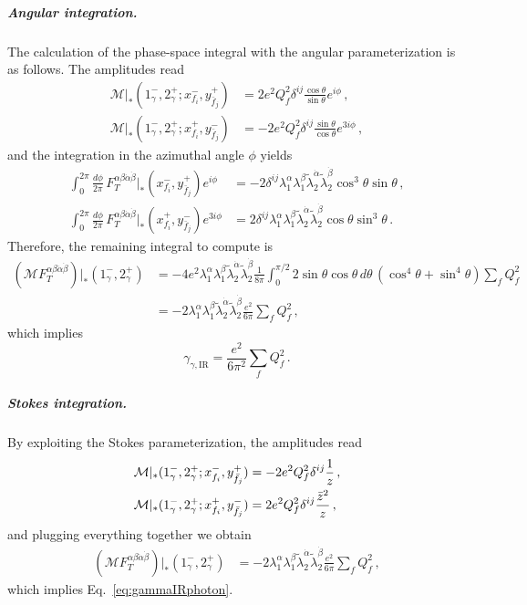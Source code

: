 \subparagraph{Angular integration.}
The calculation of the phase-space integral with the angular parameterization is as follows.
The amplitudes read
\begin{align}
    \mathcal M|_{*} (1^-_\gamma,2^+_\gamma; x_{f_i}^{-},y_{\bar f_j}^{+}) &= 2e^2 Q_f^2 \delta^{ij}\frac{\cos\theta}{\sin\theta}e^{i\phi}\,, \\
    \mathcal M|_{*} (1^-_\gamma,2^+_\gamma; x_{f_i}^{+},y_{\bar f_j}^{-}) &= -2e^2 Q_f^2 \delta^{ij}\frac{\sin\theta}{\cos\theta}e^{3i\phi}\,,
\end{align}
and the integration in the azimuthal angle $\phi$ yields
\begin{align}
    \int_0^{2\pi}\frac{d\phi}{2\pi}\,F_T^{\alpha\beta\dot\alpha\dot\beta}|_{*}(x_{f_i}^{-},y_{\bar f_j}^{+})e^{i\phi} &= -2\delta^{ij}\lambda_1^\alpha \lambda_1^\beta \tilde\lambda_2^{\dot\alpha} \tilde\lambda_2^{\dot\beta} \cos^3\theta\sin\theta\,,  \\
    \int_0^{2\pi}\frac{d\phi}{2\pi}\,F_T^{\alpha\beta\dot\alpha\dot\beta}|_{*}(x_{f_i}^{+},y_{\bar f_j}^{-})e^{3i\phi} &=2\delta^{ij}\lambda_1^\alpha \lambda_1^\beta \tilde\lambda_2^{\dot\alpha} \tilde\lambda_2^{\dot\beta} \cos\theta\sin^3\theta \,.
\end{align}
Therefore, the remaining integral to compute is
\begin{align}
    (\mathcal M F_T^{\alpha\beta\dot\alpha\dot\beta})|_{*}(1^-_\gamma,2^+_\gamma) &= -4e^2 \lambda_1^\alpha \lambda_1^\beta \tilde\lambda_2^{\dot\alpha} \tilde\lambda_2^{\dot\beta}\frac{1}{8\pi}\int_0^{\pi/2}2\sin\theta\cos\theta \,d\theta\, (\cos^4\theta+\sin^4\theta)\sum_fQ_f^2 \nonumber \\
    &= -2\lambda_1^\alpha \lambda_1^\beta \tilde\lambda_2^{\dot\alpha} \tilde\lambda_2^{\dot\beta}\frac{e^2}{6\pi}\sum_fQ_f^2\,,
\end{align}
which implies
\begin{equation}\label{eq:gammaIRphoton}
    \gamma_{\gamma,\text{IR}} = \frac{e^2}{6\pi^2} \sum_f Q_f^2\,.
\end{equation}

\subparagraph{Stokes integration.}
By exploiting the Stokes parameterization, the amplitudes read
\begin{align}
    \mathcal M|_{*} (1^-_\gamma,2^+_\gamma; x_{f_i}^{-},y_{\bar f_j}^{+}) &= -2e^2 Q_f^2 \delta^{ij}\frac{1}{z}\,, \\
    \mathcal M|_{*} (1^-_\gamma,2^+_\gamma; x_{f_i}^{+},y_{\bar f_j}^{-}) &= 2e^2 Q_f^2 \delta^{ij}\frac{\bar{z}^2}{z}\,,
\end{align}
and plugging everything together we obtain
\begin{align}
    (\mathcal M F_T^{\alpha\beta\dot\alpha\dot\beta})|_{*}(1^-_\gamma,2^+_\gamma) 
    &= -2\lambda_1^\alpha \lambda_1^\beta \tilde\lambda_2^{\dot\alpha} \tilde\lambda_2^{\dot\beta}\frac{e^2}{6\pi}\sum_fQ_f^2\,,
\end{align}
which implies Eq.~\eqref{eq:gammaIRphoton}.


